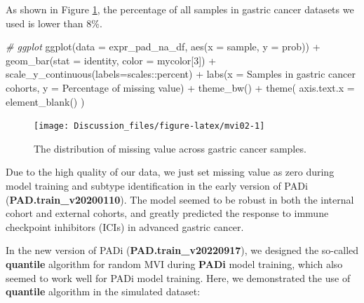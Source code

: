 \documentclass[
  12pt,
]{book}
\newenvironment{Shaded}{\begin{snugshade}}{\end{snugshade}}
\newcommand{\AttributeTok}[1]{\textcolor[rgb]{0.77,0.63,0.00}{#1}}
\newcommand{\CommentTok}[1]{\textcolor[rgb]{0.56,0.35,0.01}{\textit{#1}}}
\newcommand{\DecValTok}[1]{\textcolor[rgb]{0.00,0.00,0.81}{#1}}
\newcommand{\FunctionTok}[1]{\textcolor[rgb]{0.00,0.00,0.00}{#1}}
\newcommand{\NormalTok}[1]{#1}
\newcommand{\SpecialCharTok}[1]{\textcolor[rgb]{0.00,0.00,0.00}{#1}}
\newcommand{\StringTok}[1]{\textcolor[rgb]{0.31,0.60,0.02}{#1}}
\begin{document}
As shown in Figure \ref{fig:mvi02}, the percentage of all samples in gastric cancer datasets we used is lower than 8\%.

\begin{Shaded}
\begin{Highlighting}[]
\CommentTok{\# ggplot}
\FunctionTok{ggplot}\NormalTok{(}\AttributeTok{data =}\NormalTok{ expr\_pad\_na\_df, }
       \FunctionTok{aes}\NormalTok{(}\AttributeTok{x =}\NormalTok{ sample, }\AttributeTok{y =}\NormalTok{ prob)) }\SpecialCharTok{+} 
  \FunctionTok{geom\_bar}\NormalTok{(}\AttributeTok{stat =} \StringTok{\textquotesingle{}identity\textquotesingle{}}\NormalTok{, }\AttributeTok{color =}\NormalTok{ mycolor[}\DecValTok{3}\NormalTok{]) }\SpecialCharTok{+} 
  \FunctionTok{scale\_y\_continuous}\NormalTok{(}\AttributeTok{labels=}\NormalTok{scales}\SpecialCharTok{::}\NormalTok{percent) }\SpecialCharTok{+} 
  \FunctionTok{labs}\NormalTok{(}\AttributeTok{x =} \StringTok{\textquotesingle{}Samples in gastric cancer cohorts\textquotesingle{}}\NormalTok{, }
       \AttributeTok{y =} \StringTok{\textquotesingle{}Percentage of missing value\textquotesingle{}}\NormalTok{) }\SpecialCharTok{+} 
  \FunctionTok{theme\_bw}\NormalTok{() }\SpecialCharTok{+} 
  \FunctionTok{theme}\NormalTok{(}
    \AttributeTok{axis.text.x =} \FunctionTok{element\_blank}\NormalTok{()}
\NormalTok{  )}
\end{Highlighting}
\end{Shaded}

\begin{figure}

{\centering \texttt{[image: Discussion\_files/figure-latex/mvi02-1]} 

}

\caption{The distribution of missing value across gastric cancer samples.}\label{fig:mvi02}
\end{figure}

Due to the high quality of our data, we just set missing value as zero during model training and subtype identification in the early version of PADi (\textbf{PAD.train\_v20200110}). The model seemed to be robust in both the internal cohort and external cohorts, and greatly predicted the response to immune checkpoint inhibitors (ICIs) in advanced gastric cancer.

In the new version of PADi (\textbf{PAD.train\_v20220917}), we designed the so-called \textbf{quantile} algorithm for random MVI during \textbf{PADi} model training, which also seemed to work well for PADi model training. Here, we demonstrated the use of \textbf{quantile} algorithm in the simulated dataset:
\end{document}
